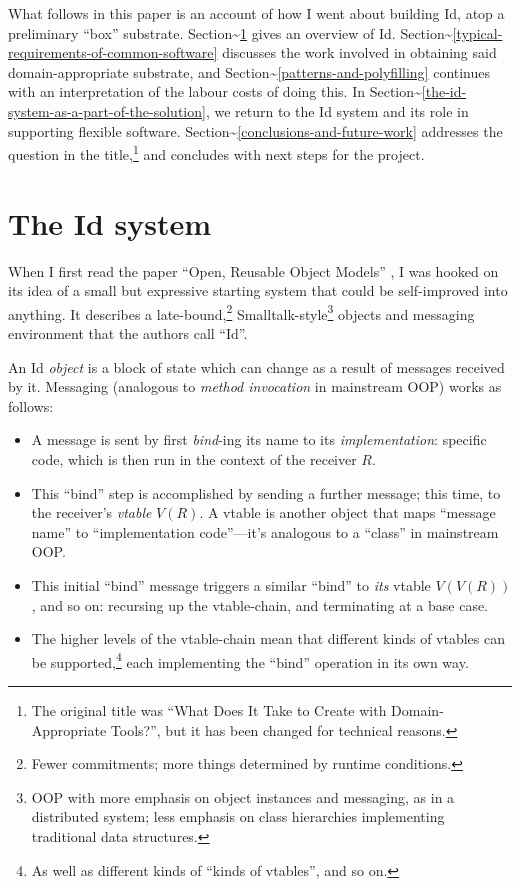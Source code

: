 What follows in this paper is an account of how I went about building
Id, atop a preliminary ``box'' substrate.
Section\textasciitilde{}\ref{the-id-system} gives an overview of Id.
Section\textasciitilde{}\ref{typical-requirements-of-common-software}
discusses the work involved in obtaining said domain-appropriate
substrate, and Section\textasciitilde{}\ref{patterns-and-polyfilling}
continues with an interpretation of the labour costs of doing this. In
Section\textasciitilde{}\ref{the-id-system-as-a-part-of-the-solution},
we return to the Id system and its role in supporting flexible software.
Section\textasciitilde{}\ref{conclusions-and-future-work} addresses the
question in the title,\footnote{The original title was ``What Does It
  Take to Create with Domain-Appropriate Tools?'', but it has been
  changed for technical reasons.} and concludes with next steps for the
project.

\hypertarget{the-id-system}{%
\section{The Id system}\label{the-id-system}}

When I first read the paper ``Open, Reusable Object Models''
\cite{OROM}, I was hooked on its idea of a small but expressive starting
system that could be self-improved into anything. It describes a
late-bound,\footnote{Fewer commitments; more things determined by
  runtime conditions.} Smalltalk-style\footnote{OOP with more emphasis
  on object instances and messaging, as in a distributed system; less
  emphasis on class hierarchies implementing traditional data
  structures.} objects and messaging environment that the authors call
``Id''.

An Id{} \emph{object} is a block of state which can change as a result
of messages received by it. Messaging (analogous to \emph{method
invocation} in mainstream OOP) works as follows:

\begin{itemize}
\tightlist
\item
  A message is sent by first \emph{bind}-ing its name to its
  \emph{implementation}: specific code, which is then run in the context
  of the receiver \(R\).
\item
  This ``bind'' step is accomplished by sending a further message; this
  time, to the receiver's \emph{vtable} \(V(R)\). A vtable is another
  object that maps ``message name'' to ``implementation code''---it's
  analogous to a ``class'' in mainstream OOP.
\item
  This initial ``bind'' message triggers a similar ``bind'' to
  \emph{its} vtable \(V(V(R))\), and so on: recursing up the
  vtable-chain, and terminating at a base case.
\item
  The higher levels of the vtable-chain mean that different kinds of
  vtables can be supported,\footnote{As well as different kinds of
    ``kinds of vtables'', and so on.} each implementing the ``bind''
  operation in its own way.
\end{itemize}

